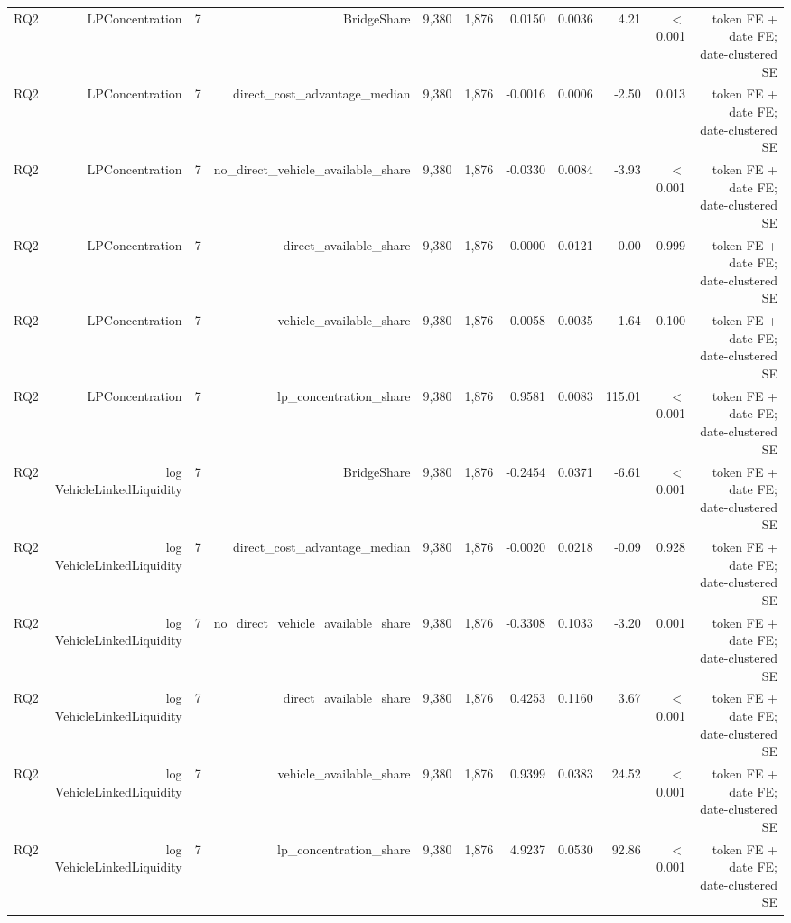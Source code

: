 \begin{tabular}{lrrrrrrrrrr}
RQ2 & LPConcentration & 7 & BridgeShare & 9,380 & 1,876 & 0.0150 & 0.0036 & 4.21 & \ensuremath{<}0.001 & token FE + date FE; date-clustered SE \\
RQ2 & LPConcentration & 7 & direct\_cost\_advantage\_median & 9,380 & 1,876 & -0.0016 & 0.0006 & -2.50 & 0.013 & token FE + date FE; date-clustered SE \\
RQ2 & LPConcentration & 7 & no\_direct\_vehicle\_available\_share & 9,380 & 1,876 & -0.0330 & 0.0084 & -3.93 & \ensuremath{<}0.001 & token FE + date FE; date-clustered SE \\
RQ2 & LPConcentration & 7 & direct\_available\_share & 9,380 & 1,876 & -0.0000 & 0.0121 & -0.00 & 0.999 & token FE + date FE; date-clustered SE \\
RQ2 & LPConcentration & 7 & vehicle\_available\_share & 9,380 & 1,876 & 0.0058 & 0.0035 & 1.64 & 0.100 & token FE + date FE; date-clustered SE \\
RQ2 & LPConcentration & 7 & lp\_concentration\_share & 9,380 & 1,876 & 0.9581 & 0.0083 & 115.01 & \ensuremath{<}0.001 & token FE + date FE; date-clustered SE \\
RQ2 & log VehicleLinkedLiquidity & 7 & BridgeShare & 9,380 & 1,876 & -0.2454 & 0.0371 & -6.61 & \ensuremath{<}0.001 & token FE + date FE; date-clustered SE \\
RQ2 & log VehicleLinkedLiquidity & 7 & direct\_cost\_advantage\_median & 9,380 & 1,876 & -0.0020 & 0.0218 & -0.09 & 0.928 & token FE + date FE; date-clustered SE \\
RQ2 & log VehicleLinkedLiquidity & 7 & no\_direct\_vehicle\_available\_share & 9,380 & 1,876 & -0.3308 & 0.1033 & -3.20 & 0.001 & token FE + date FE; date-clustered SE \\
RQ2 & log VehicleLinkedLiquidity & 7 & direct\_available\_share & 9,380 & 1,876 & 0.4253 & 0.1160 & 3.67 & \ensuremath{<}0.001 & token FE + date FE; date-clustered SE \\
RQ2 & log VehicleLinkedLiquidity & 7 & vehicle\_available\_share & 9,380 & 1,876 & 0.9399 & 0.0383 & 24.52 & \ensuremath{<}0.001 & token FE + date FE; date-clustered SE \\
RQ2 & log VehicleLinkedLiquidity & 7 & lp\_concentration\_share & 9,380 & 1,876 & 4.9237 & 0.0530 & 92.86 & \ensuremath{<}0.001 & token FE + date FE; date-clustered SE \\
\bottomrule
\end{tabular}
